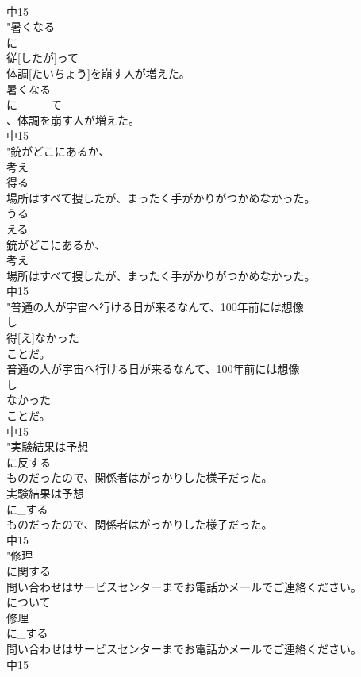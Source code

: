 \documentclass[8pt]{extreport}
\begin{document}
\begin{CJK}{UTF8}{min}
\\	中15
\\	"暑くなる
\\	に
\\	従[したが]って
\\	体調[たいちょう]を崩す人が増えた。
\\	暑くなる
\\	に____て
\\	、体調を崩す人が増えた。
\\	中15
\\	"銃がどこにあるか、
\\	考え
\\	得る
\\	場所はすべて捜したが、まったく手がかりがつかめなかった。
\\	うる
\\	える
\\	銃がどこにあるか、
\\	考え
\\	場所はすべて捜したが、まったく手がかりがつかめなかった。
\\	中15
\\	"普通の人が宇宙へ行ける日が来るなんて、100年前には想像
\\	し
\\	得[え]なかった
\\	ことだ。
\\	普通の人が宇宙へ行ける日が来るなんて、100年前には想像
\\	し
\\	なかった
\\	ことだ。
\\	中15
\\	"実験結果は予想
\\	に反する
\\	ものだったので、関係者はがっかりした様子だった。
\\	実験結果は予想
\\	に_する
\\	ものだったので、関係者はがっかりした様子だった。
\\	中15
\\	"修理
\\	に関する
\\	問い合わせはサービスセンターまでお電話かメールでご連絡ください。
\\	について 
\\	修理
\\	に_する
\\	問い合わせはサービスセンターまでお電話かメールでご連絡ください。
\\	中15

\end{CJK}
\end{document}
